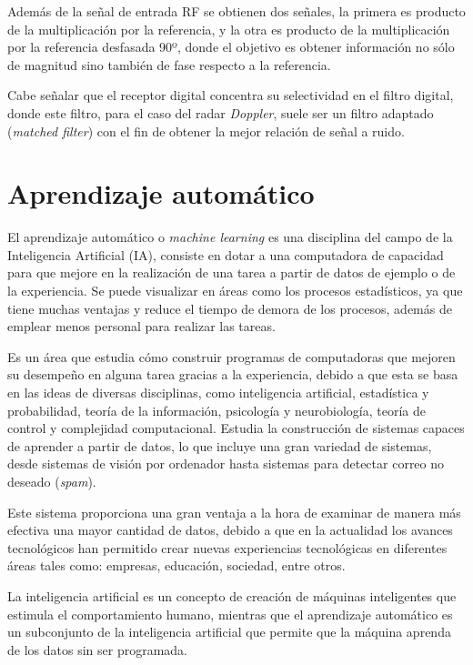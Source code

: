 Además de la señal de entrada RF se obtienen dos señales, la primera es producto de la multiplicación por la referencia, y la otra es producto de la multiplicación por la referencia desfasada 90º, donde el objetivo es obtener información no sólo de magnitud sino también de fase respecto a la referencia.

Cabe señalar que el receptor digital concentra su selectividad en el filtro digital, donde este filtro, para el caso del radar \textit{Doppler}, suele ser un filtro adaptado (\textit{matched filter}) con el fin de obtener la mejor relación de señal a ruido.


\section{Aprendizaje automático}

El aprendizaje automático o \textit{machine learning} es una disciplina del campo de la Inteligencia Artificial (IA),
consiste en dotar a una computadora de capacidad para que mejore en la realización de una tarea a partir de datos de ejemplo o de la experiencia. Se puede visualizar en áreas como los procesos estadísticos, ya que tiene muchas ventajas y reduce el tiempo de demora de los procesos, además de emplear menos personal para realizar las tareas.

Es un área que estudia cómo construir programas de computadoras que mejoren su desempeño en alguna tarea gracias a la experiencia, debido a que esta se basa en las ideas de diversas disciplinas, como inteligencia artificial, estadística y probabilidad, teoría de la información, psicología y neurobiología, teoría de control y complejidad computacional. Estudia la construcción de sistemas capaces de aprender a partir de datos, lo que incluye una gran variedad de sistemas, desde sistemas de visión por ordenador hasta sistemas para detectar correo no deseado (\textit{spam}).

Este sistema proporciona una gran ventaja a la hora de examinar de manera más efectiva una mayor cantidad de datos, debido a que en la actualidad los avances tecnológicos han permitido crear nuevas experiencias tecnológicas en diferentes áreas tales como: empresas, educación, sociedad, entre otros.

La inteligencia artificial es un concepto de creación de máquinas inteligentes que estimula el comportamiento humano, mientras que el aprendizaje automático es un subconjunto de la inteligencia artificial que permite que la máquina aprenda de los datos sin ser programada.

